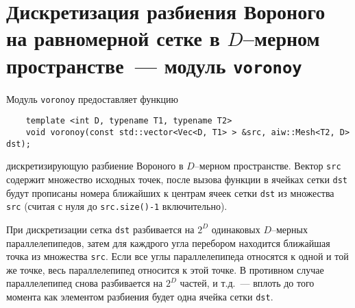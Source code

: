 \section{Дискретизация разбиения Вороного на равномерной сетке в $D$--мерном пространстве~--- модуль {\tt voronoy}}
Модуль \verb'voronoy' предоставляет функцию
\begin{verbatim}
    template <int D, typename T1, typename T2>
    void voronoy(const std::vector<Vec<D, T1> > &src, aiw::Mesh<T2, D> dst);
\end{verbatim}
дискретизирующую разбиение Вороного в $D$--мерном пространстве.
Вектор \verb'src' содержит множество исходных точек,
после вызова функции в ячейках сетки \verb'dst' будут прописаны номера ближайших
к центрам ячеек сетки \verb'dst' из множества \verb'src' (считая с нуля до \verb'src.size()-1' включительно).

При дискретизации сетка \verb'dst' разбивается на $2^D$ одинаковых $D$--мерных параллелепипедов,
затем для каждрого угла перебором находится ближайшая точка из множества \verb'src'.
Если все углы параллелепипеда относятся к одной и той же точке, весь параллелепипед относится к этой точке.
В противном случае параллелепипед снова разбивается на $2^D$ частей, и т.д.~--- вплоть до того момента как элементом
разбиения будет одна ячейка сетки \verb'dst'. 
